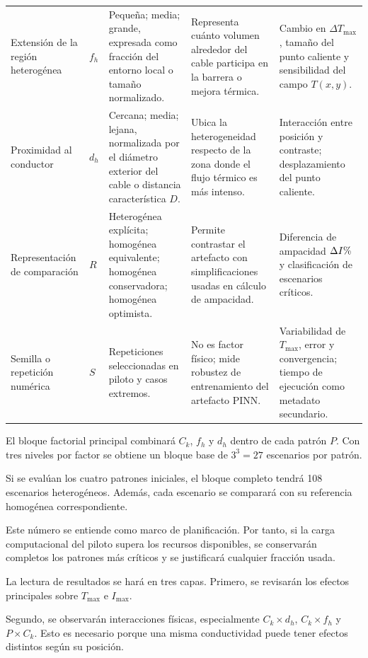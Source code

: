 \documentclass[11pt,a4paper,oneside]{report}
\newcommand{\tesisbodyfont}{\fontsize{11}{13.6}\selectfont}
\newcommand{\Tmax}{T_{\max}}
\newcommand{\Imax}{I_{\max}}
\newcommand{\pct}{\mbox{\char37}}
\begin{document}
\begin{singlespace}
\begin{landscape}
\begin{longtable}{L{2.65cm}L{1.35cm}L{5.1cm}L{5.1cm}L{5.2cm}}
Extensión de la región heterogénea & $f_h$ & Pequeña; media; grande, expresada como fracción del entorno local o tamaño normalizado. & Representa cuánto volumen alrededor del cable participa en la barrera o mejora térmica. & Cambio en $\Delta\Tmax$, tamaño del punto caliente y sensibilidad del campo $T(x,y)$. \\

Proximidad al conductor & $d_h$ & Cercana; media; lejana, normalizada por el diámetro exterior del cable o distancia característica $D$. & Ubica la heterogeneidad respecto de la zona donde el flujo térmico es más intenso. & Interacción entre posición y contraste; desplazamiento del punto caliente. \\

Representación de comparación & $R$ & Heterogénea explícita; homogénea equivalente; homogénea conservadora; homogénea optimista. & Permite contrastar el artefacto con simplificaciones usadas en cálculo de ampacidad. & Diferencia de ampacidad $\Delta I\pct$ y clasificación de escenarios críticos. \\

Semilla o repetición numérica & $S$ & Repeticiones seleccionadas en piloto y casos extremos. & No es factor físico; mide robustez de entrenamiento del artefacto PINN. & Variabilidad de $\Tmax$, error y convergencia; tiempo de ejecución como metadato secundario. \\

\end{longtable}

\tesisbodyfont

El bloque factorial principal combinará $C_k$, $f_h$ y $d_h$ dentro de cada patrón $P$. Con tres niveles por factor se obtiene un bloque base de $3^3=27$ escenarios por patrón.

Si se evalúan los cuatro patrones iniciales, el bloque completo tendrá 108 escenarios heterogéneos. Además, cada escenario se comparará con su referencia homogénea correspondiente.

Este número se entiende como marco de planificación. Por tanto, si la carga computacional del piloto supera los recursos disponibles, se conservarán completos los patrones más críticos y se justificará cualquier fracción usada.

La lectura de resultados se hará en tres capas. Primero, se revisarán los efectos principales sobre $\Tmax$ e $\Imax$.

Segundo, se observarán interacciones físicas, especialmente $C_k\times d_h$, $C_k\times f_h$ y $P\times C_k$. Esto es necesario porque una misma conductividad puede tener efectos distintos según su posición.


\end{landscape}
\end{singlespace}
\end{document}
